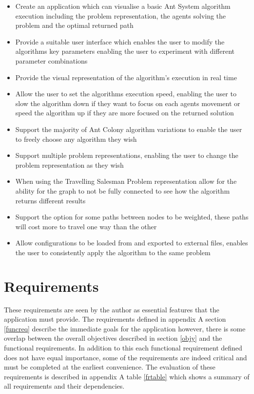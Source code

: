 \begin{itemize}
\item Create an application which can visualise a basic Ant System algorithm execution including the problem representation, the agents solving the problem and the optimal returned path
\item Provide a suitable user interface which enables the user to modify the algorithms key parameters enabling the user to experiment with different parameter combinations
\item Provide the visual representation of the algorithm’s execution in real time
\item Allow the user to set the algorithms execution speed, enabling the user to slow the algorithm down if they want to focus on each agents movement or speed the algorithm up if they are more focused on the returned solution
\item Support the majority of Ant Colony algorithm variations to enable the user to freely choose any algorithm they wish
\item Support multiple problem representations, enabling the user to change the problem representation as they wish
\item When using the Travelling Salesman Problem representation allow for the ability for the graph to not be fully connected to see how the algorithm returns different results
\item Support the option for some paths between nodes to be weighted, these paths will cost more to travel one way than the other
\item Allow configurations to be loaded from and exported to external files, enables the user to consistently apply the algorithm to the same problem
\end{itemize}


\section{Requirements}
\label{funcymcdunky}
These requirements are seen by the author as essential features that the application must provide. The requirements defined in appendix A section \ref{funcreq} describe the immediate goals for the application however, there is some overlap between the overall objectives described in section \ref{objy} and the functional requirements. In addition to this each functional requirement defined does not have equal importance, some of the requirements are indeed critical and must be completed at the earliest convenience. The evaluation of these requirements is described in appendix A table \ref{frtable} which shows a summary of all requirements and their dependencies.

